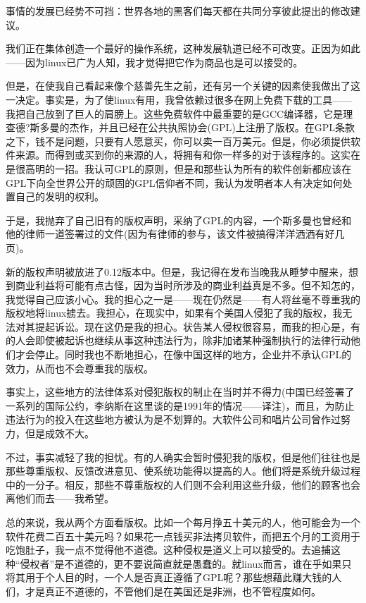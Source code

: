 事情的发展已经势不可挡：世界各地的黑客们每天都在共同分享彼此提出的修改建议。

我们正在集体创造一个最好的操作系统，这种发展轨道已经不可改变。正因为如此——因为linux已广为人知，我才觉得把它作为商品也是可以接受的。

但是，在使我自己看起来像个慈善先生之前，还有另一个关键的因素使我做出了这一决定。事实是，为了使linux有用，我曾依赖过很多在网上免费下载的工具——我把自己放到了巨人的肩膀上。这些免费软件中最重要的是GCC编译器，它是理查德?斯多曼的杰作，并且已经在公共执照协会(GPL)上注册了版权。在GPL条款之下，钱不是问题，只要有人愿意买，你可以卖一百万美元。但是，你必须提供软件来源。而得到或买到你的来源的人，将拥有和你一样多的对于该程序的。这实在是很高明的一招。我认可GPL的原则，但是和那些认为所有的软件创新都应该在GPL下向全世界公开的顽固的GPL信仰者不同，我认为发明者本人有决定如何处置自己的发明的权利。

于是，我抛弃了自己旧有的版权声明，采纳了GPL的内容，一个斯多曼也曾经和他的律师一道签署过的文件(因为有律师的参与，该文件被搞得洋洋洒洒有好几页)。

新的版权声明被放进了0.12版本中。但是，我记得在发布当晚我从睡梦中醒来，想到商业利益将可能有点古怪，因为当时所涉及的商业利益真是不多。但不知怎的，我觉得自己应该小心。我的担心之一是——现在仍然是——有人将丝毫不尊重我的版权地将linux掳去。我担心，在现实中，如果有个美国人侵犯了我的版权，我无法对其提起诉讼。现在这仍是我的担心。状告某人侵权很容易，而我的担心是，有的人会即使被起诉也继续从事这种违法行为，除非加诸某种强制执行的法律行动他们才会停止。同时我也不断地担心，在像中国这样的地方，企业并不承认GPL的效力，从而也不会尊重我的版权。

事实上，这些地方的法律体系对侵犯版权的制止在当时并不得力(中国已经签署了一系列的国际公约，李纳斯在这里谈的是1991年的情况——译注)，而且，为防止违法行为的投入在这些地方被认为是不划算的。大软件公司和唱片公司曾作过努力，但是成效不大。

不过，事实减轻了我的担忧。有的人确实会暂时侵犯我的版权，但是他们往往也是那些尊重版权、反馈改进意见、使系统功能得以提高的人。他们将是系统升级过程中的一分子。相反，那些不尊重版权的人们则不会利用这些升级，他们的顾客也会离他们而去——我希望。

总的来说，我从两个方面看版权。比如一个每月挣五十美元的人，他可能会为一个软件花费二百五十美元吗？如果花一点钱买非法拷贝软件，而把五个月的工资用于吃饱肚子，我一点不觉得他不道德。这种侵权是道义上可以接受的。去追捕这种“侵权者”是不道德的，更不要说简直就是愚蠢的。就linux而言，谁在乎如果只将其用于个人目的时，一个人是否真正遵循了GPL呢？那些想藉此赚大钱的人们，才是真正不道德的，不管他们是在美国还是非洲，也不管程度如何。

